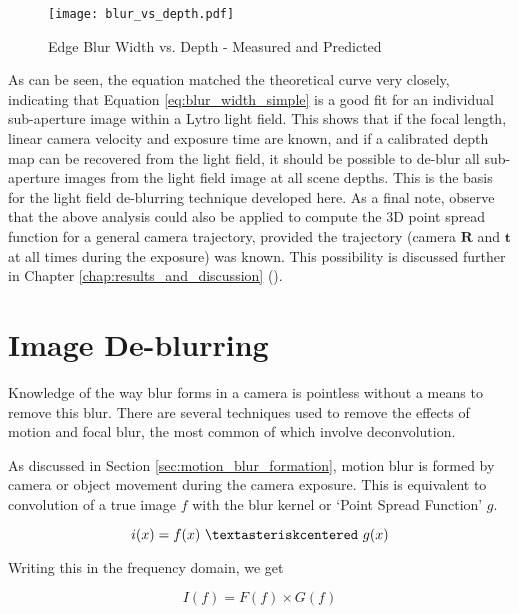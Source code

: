 \begin{figure}[h]
\centering
\texttt{[image: blur\_vs\_depth.pdf]}
\caption[Edge Blur Width vs. Depth]{
Edge Blur Width vs. Depth - Measured and Predicted
}
\label{fig:blur_vs_depth}
\end{figure}

As can be seen, the equation matched the theoretical curve very closely, indicating that Equation \ref{eq:blur_width_simple} is a good fit for an individual sub-aperture image within a Lytro light field.
This shows that if the focal length, linear camera velocity and exposure time are known, and if a calibrated depth map can be recovered from the light field, it should be possible to de-blur all sub-aperture images from the light field image at all scene depths.
This is the basis for the light field de-blurring technique developed here.
As a final note, observe that the above analysis could also be applied to compute the 3D point spread function for a general camera trajectory, provided the trajectory (camera $\boldsymbol{R}$ and $\boldsymbol{t}$ at all times during the exposure) was known.
This possibility is discussed further in Chapter \ref{chap:results_and_discussion} ().


\section{Image De-blurring}
\label{sec:image_deblurring}

Knowledge of the way blur forms in a camera is pointless without a means to remove this blur.
There are several techniques used to remove the effects of motion and focal blur, the most common of which involve deconvolution.

As discussed in Section \ref{sec:motion_blur_formation}, motion blur is formed by camera or object movement during the camera exposure.
This is equivalent to convolution of a true image $f$ with the blur kernel or \enquote*{Point Spread Function} $g$.

\begin{equation}
\label{eq:spatial_blur_simple}
i(x) = f(x)~\textasteriskcentered~g(x)
\end{equation}

Writing this in the frequency domain, we get

\begin{equation}
\label{eq:frequency_blur_simple}
I(f) = F(f) \times G(f)
\end{equation}

